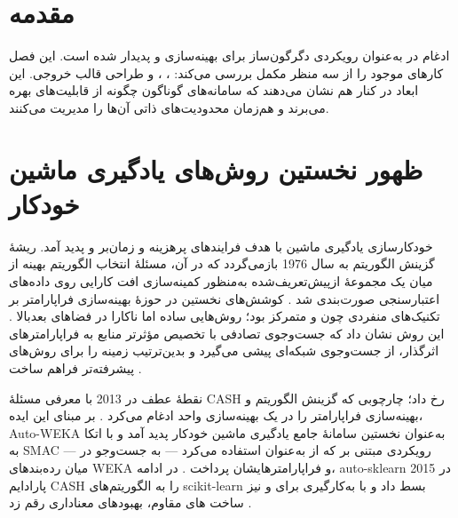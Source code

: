 \section{مقدمه}
ادغام  در  به‌عنوان رویکردی دگرگون‌ساز برای بهینه‌سازی  و  پدیدار شده است. این فصل کارهای موجود را از سه منظر مکمل بررسی می‌کند: ، ، و طراحی قالب خروجی. این ابعاد در کنار هم نشان می‌دهند که سامانه‌های گوناگون چگونه از قابلیت‌های  بهره می‌برند و هم‌زمان محدودیت‌های ذاتی آن‌ها را مدیریت می‌کنند.

\section{ظهور نخستین روش‌های یادگیری ماشین خودکار}
خودکارسازی یادگیری ماشین با هدف  فرایندهای پرهزینه و زمان‌بر  و  پدید آمد. ریشهٔ گزینش الگوریتم به سال 1976 بازمی‌گردد که در آن، مسئلهٔ انتخاب الگوریتم بهینه از میان یک مجموعهٔ ازپیش‌تعریف‌شده به‌منظور کمینه‌سازی افت کارایی روی داده‌های اعتبارسنجی صورت‌بندی شد \cite{RICE197665}. کوشش‌های نخستین در حوزهٔ بهینه‌سازی فراپارامتر بر تکنیک‌های منفردی چون  و  متمرکز بود؛ روش‌هایی ساده اما ناکارا در فضاهای بعدبالا \cite{JMLR:v13:bergstra12a}. این روش نشان داد که جست‌وجوی تصادفی با تخصیص مؤثرتر منابع به فراپارامترهای اثرگذار، از جست‌وجوی شبکه‌ای پیشی می‌گیرد و بدین‌ترتیب زمینه را برای روش‌های پیشرفته‌تر فراهم ساخت \cite{JMLR:v13:bergstra12a}.

نقطهٔ عطف در 2013 با معرفی مسئلهٔ CASH رخ داد؛ چارچوبی که گزینش الگوریتم و بهینه‌سازی فراپارامتر را در یک بهینه‌سازی واحد ادغام می‌کرد \cite{10.1145/2487575.2487629}. بر مبنای این ایده، Auto-WEKA به‌عنوان نخستین سامانهٔ جامع یادگیری ماشین خودکار پدید آمد و با اتکا به SMAC — رویکردی مبتنی بر  که از  به‌عنوان  استفاده می‌کرد — به جست‌وجو در میان رده‌بندهای WEKA و فراپارامترهایشان پرداخت \cite{10.1145/2487575.2487629, 10.1007/978-3-642-25566-3_40}. در ادامه، auto-sklearn در 2015 پارادایم CASH را به الگوریتم‌های scikit-learn بسط داد و با به‌کارگیری  برای  و نیز ساخت ‌های مقاوم، بهبودهای معناداری رقم زد \cite{NIPS2015_11d0e628}.

